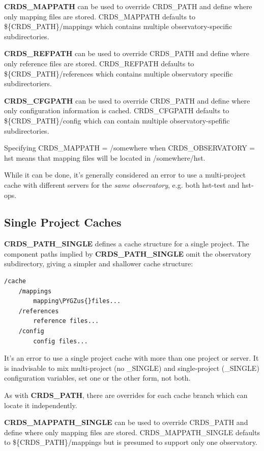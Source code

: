 \documentclass[letterpaper,10pt,english]{sphinxmanual}
\def\PYGZus{\char`\_}
\begin{document}
\textbf{CRDS\_MAPPATH} can be used to override CRDS\_PATH and define where
only mapping files are stored.  CRDS\_MAPPATH defaults to \$\{CRDS\_PATH\}/mappings
which contains multiple observatory-specific subdirectories.

\textbf{CRDS\_REFPATH} can be used to override CRDS\_PATH and define where
only reference files are stored.  CRDS\_REFPATH defaults to \$\{CRDS\_PATH\}/references
which contains multiple observatory specific subdirectoriers.

\textbf{CRDS\_CFGPATH} can be used to override CRDS\_PATH and define where
only configuration information is cached. CRDS\_CFGPATH defaults to \$\{CRDS\_PATH\}/config
which can contain multiple observatory-spefific subdirectories.

Specifying CRDS\_MAPPATH = /somewhere when CRDS\_OBSERVATORY = hst means that
mapping files will be located in /somewhere/hst.

While it can be done,  it's generally considered an error to use a multi-project cache
with different servers for the \emph{same observatory}, e.g. both hst-test and hst-ops.


\subsection{Single Project Caches}
\label{installation:single-project-caches}
\textbf{CRDS\_PATH\_SINGLE} defines a cache structure for a single project.  The component paths
implied by \textbf{CRDS\_PATH\_SINGLE}  omit the observatory subdirectory,  giving a simpler and
shallower cache structure:

\begin{Verbatim}[commandchars=\\\{\}]
/cache
    /mappings
        mapping\PYGZus{}files...
    /references
        reference files...
    /config
        config files...
\end{Verbatim}

It's an error to use a single project cache with more than one project or server.  It is
inadvisable to mix multi-project (no \_SINGLE) and single-project (\_SINGLE) configuration
variables,  set one or the other form,  not both.

As with \textbf{CRDS\_PATH},  there are overrides for each cache branch which can locate it
independently.

\textbf{CRDS\_MAPPATH\_SINGLE} can be used to override CRDS\_PATH and define where only
mapping files are stored. CRDS\_MAPPATH\_SINGLE defaults to \$\{CRDS\_PATH\}/mappings
but is presumed to support only one observatory.
\end{document}
